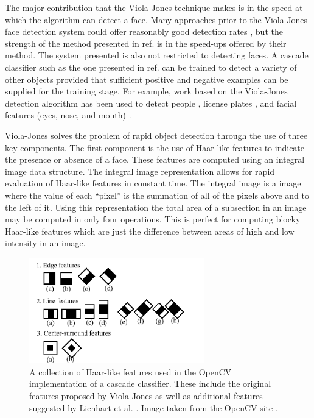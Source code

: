 \documentclass[conference]{IEEEtran}
\begin{document}
The major contribution that the Viola-Jones technique makes is in the speed at which the algorithm can detect a face. Many approaches prior to the Viola-Jones face detection system could offer reasonably good detection rates \cite{sung1998example} \cite{schneiderman2000statistical} \cite{rowley1998neural}, but the strength of the method presented in ref. \cite{viola2004robust} is in the speed-ups offered by their method. The system presented is also not restricted to detecting faces. A cascade classifier such as the one presented in ref. \cite{viola2004robust} can be trained to detect a variety of other objects provided that sufficient positive and negative examples can be supplied for the training stage. For example, work based on the Viola-Jones detection algorithm has been used to detect people \cite{viola2003detecting}, license plates \cite{zhang2006learning}, and facial features (eyes, nose, and mouth) \cite{wilson2006facial}.

Viola-Jones solves the problem of rapid object detection through the use of three key components. The first component is the use of Haar-like features to indicate the presence or absence of a face. These features are computed using an integral image data structure. The integral image representation allows for rapid evaluation of Haar-like features in constant time. The integral image is a image where the value of each ``pixel'' is the summation of all of the pixels above and to the left of it. Using this representation the total area of a subsection in an image may be computed in only four operations. This is perfect for computing blocky Haar-like features which are just the difference between areas of high and low intensity in an image.

\begin{figure}[!t]
\centering
\includegraphics[width=3in]{img/haarfeatures.png}
\caption{A collection of Haar-like features used in the OpenCV implementation of a cascade classifier. These include the original features proposed by Viola-Jones \cite{viola2004robust} as well as additional features suggested by Lienhart et al. \cite{lienhart2002extended}. Image taken from the OpenCV site \cite{opencv2014cascade}.}
\label{fig:haar-features}
\end{figure}
\end{document}
